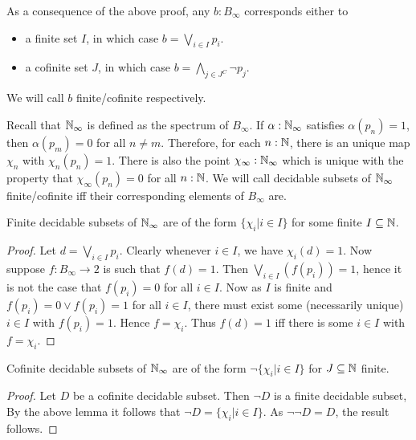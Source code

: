 \begin{remark}\label{AppendixCofiniteOrFinite}
  As a consequence of the above proof, any $b:B_\infty$ corresponds either to 
  \begin{itemize}
    \item a finite set $I$, in which case $b = \bigvee_{i\in I} p_i$. 
    \item a cofinite set $J$, in which case $b = \bigwedge_{j\in J^C} \neg p_j$. 
  \end{itemize}
  We will call $b$ finite/cofinite respectively. 
\end{remark}
\begin{remark}
Recall that $\mathbb{N}_{\infty}$ is defined as the spectrum of $B_\infty$. 
If $\alpha:\mathbb{N}_{\infty}$ satisfies $\alpha(p_n) = 1$, then $\alpha(p_m) = 0$ for all $n\neq m$. 
Therefore, for each $n:\mathbb{N}$, there is an unique map $\chi_n$ with $\chi_n(p_n) = 1$. 
There is also the point $\chi_\infty : \mathbb{N}_{\infty}$ which is unique 
with the property that $ \chi_\infty(p_n) = 0$ for all $n:\mathbb{N}$. 
We will call decidable subsets of $\mathbb{N}_{\infty}$ finite/cofinite iff their corresponding elements of $B_\infty$ are. 
\end{remark}
\begin{lemma}\label{FiniteDecidableSubsetsCharacterization}
  Finite decidable subsets of $\mathbb{N}_{\infty}$ are of the form 
  $\{\chi_i | i \in I\}$ for some finite $I\subseteq \mathbb{N}$. 
\end{lemma}
\begin{proof}
  Let $d= \bigvee_{i\in I} p_i$. 
  Clearly whenever $i\in I$, we have $\chi_i(d) = 1$. 
%
  Now suppose $f:B_\infty \to 2$ is such that $f(d) = 1$. 
  Then $\bigvee_{i\in I}(f(p_i)) = 1$, hence it is not the case that $f(p_i) = 0$ for all $i\in I$. 
  Now as $I$ is finite and $f(p_i) = 0 \vee f(p_i) = 1$ for all $i\in I$, 
  there must exist some (necessarily unique) $i\in I$ with $f(p_i) = 1$. Hence $f = \chi_i$. 
%
  Thus $f(d) = 1$ iff there is some $i\in I$ with $f = \chi_i$. 
\end{proof}
\begin{corollary}\label{CoFiniteDecidableSubsetsCharacterization}
  Cofinite decidable subsets of $\mathbb{N}_{\infty}$ are of the form
  $\neg \{\chi_i | i \in I\}$ for $J\subseteq\mathbb{N}$ finite. 
\end{corollary}
\begin{proof}
  Let $D$ be a cofinite decidable subset. Then $\neg D$ is a finite decidable subset, 
  By the above lemma it follows that $\neg D = \{\chi_i | i\in I\}$. 
  As $\neg \neg D = D$, the result follows. 
\end{proof}
